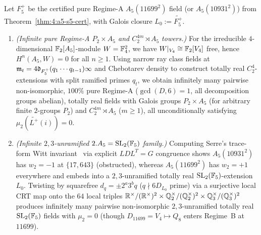 \begin{theorem}\label{thm:4:inf-a5}
\tagProved{}
Let $F_5^+$ be the certified pure Regime-A $A_5(11699^2)$ field (or $A_5(10931^2)$) from Theorem~\ref{thm:4:a5-s5-cert}, with Galois closure $L_0 := \widetilde{F_5^+}$.
\begin{enumerate}[label=\textup{(\roman*)}]
\item \emph{(Infinite pure Regime-A $P_2 \times A_5$ and $C_2^{4m}\rtimes A_5$ towers.)} For the irreducible $4$-dimensional $\mathbb{F}_2[A_5]$-module $W = \mathbb{F}_4^2$, we have $W|_{V_4} \cong \mathbb{F}_2[V_4]$ free, hence $H^n(A_5, W) = 0$ for all $n \ge 1$. Using narrow ray class fields at $\mathfrak{m}_t = 4 \mathfrak{d}_{F_5^+}(q_1\cdots q_{t-1})\infty$ and Chebotarev density to construct totally real $C_2^4$-extensions with split ramified primes $q_t$, we obtain infinitely many pairwise non-isomorphic, $100\%$ pure Regime-A ($\gcd(D,6)=1$, all decomposition groups abelian), totally real fields with Galois groups $P_2 \times A_5$ (for arbitrary finite $2$-groups $P_2$) and $C_2^{4m} \rtimes A_5$ ($m \ge 1$), all unconditionally satisfying $\mu_2(\widetilde{L^+}(i)) = 0$.
\item \emph{(Infinite $2,3$-unramified $2.A_5 = \mathrm{SL}_2(\mathbb{F}_5)$ family.)} Computing Serre's trace-form Witt invariant~\cite{Serre1984} via explicit $LDL^T = G$ congruence shows $A_5(10931^2)$ has $w_2 = -1$ at $\{17, 643\}$ (obstructed), whereas $A_5(11699^2)$ has $w_2 = +1$ everywhere and embeds into a $2,3$-unramified totally real $\mathrm{SL}_2(\mathbb{F}_5)$-extension $L_0$. Twisting by squarefree $d_q = \pm 2^a 3^b q$ ($q \nmid 6 D_{L_0}$ prime) via a surjective local CRT map onto the $64$ local triples $\mathbb{R}^\times/(\mathbb{R}^\times)^2 \times \mathbb{Q}_2^\times/(\mathbb{Q}_2^\times)^2 \times \mathbb{Q}_3^\times/(\mathbb{Q}_3^\times)^2$ produces infinitely many pairwise non-isomorphic $2,3$-unramified totally real $\mathrm{SL}_2(\mathbb{F}_5)$ fields with $\mu_2 = 0$ (though $D_{11699} = V_4 \mapsto Q_8$ enters Regime~B at $11699$).
\end{enumerate}
\end{theorem}
